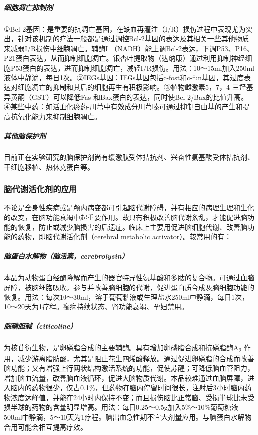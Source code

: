 \subparagraph{细胞凋亡抑制剂}

①Bcl-2基因：是重要的抗凋亡基因，在缺血再灌注（I/R）损伤过程中表现尤为突出，针对该机制的疗法一般都是通过调控Bcl-2基因的表达及其相关一些其他物质来减弱I/R损伤中细胞凋亡。辅酶I
（NADH）能上调Bcl-2表达，下调P53、P16、P21蛋白表达，从而抑制细胞凋亡。银杏叶提取物（达纳康）通过利用抑制神经细胞P53蛋白的表达，进而抑制细胞凋亡，减轻I/R损伤。用法：10～15ml加入250ml液体中静滴，每日1次。②IEGs基因：IEGs基因包括c-fost和c-fun基因，其过度表达对细胞凋亡的抑制和其后的细胞再生有积极影响。③植物雌激素5，7，4-三羟基异黄酮（GST）可以降低Fas
和Bax蛋白的表达，同时使Bcl-2/Bax的比值升高。④某些中药：如活血化瘀药-川芎中有效成分川芎嗪可通过抑制自由基的产生和提高抗氧化能力来抑制细胞凋亡。

\subparagraph{其他脑保护剂}

目前正在实验研究的脑保护剂尚有缓激肽受体拮抗剂、兴奋性氨基酸受体拮抗剂、干细胞移植、热休克蛋白等。

\subsubsection{脑代谢活化剂的应用}

不论是全身性疾病或是颅内病变都可引起脑代谢障碍，并有相应的病理生理和生化的改变，在脑功能衰竭中起重要作用。故只有积极改善脑代谢紊乱，才能促进脑功能的恢复，防止或减少脑损害的后遗症。临床上主要用促进脑细胞代谢、改善脑功能的药物，即脑代谢活化剂（cerebral
metabolic activator）。较常用的有：

\subparagraph{脑蛋白水解物（脑活素，cerebrolysin）}

本品为动物蛋白经酶降解而产生的器官特异性氨基酸和多肽的复合物。可通过血脑屏障，被脑细胞吸收。参与并改善脑细胞的代谢，促进蛋白质合成及脑细胞功能的恢复。用法：每次10～30ml，溶于葡萄糖液或生理盐水250ml中静滴，每日1次，10～20天为1疗程。癫痫持续状态、肾功能衰竭、孕妇禁用。

\subparagraph{胞磷胆碱（citicoline）}

为核苷衍生物，是卵磷脂合成的主要辅酶。具有增加卵磷脂合成和抗磷脂酶A\textsubscript{2}
作用，减少游离脂肪酸，尤其是阻止花生四烯酸释放。通过促进卵磷脂的合成而改善脑功能；又有增强上行网状结构激活系统的功能，促使苏醒；可降低脑血管阻力，增加脑血流量，改善脑血液循环，促进大脑物质代谢。本品较难通过血脑屏障，进入脑内的药物很少，仅占0.1\%，但药物在脑内停留时间很长，注射后3小时脑内药物浓度达峰值，并能在24小时内保持不变；而且损伤脑比正常脑、受损半球比未受损半球的药物的含量明显增高。用法：每日0.25～0.5g加入5\%～10\%葡萄糖液500ml中静滴，5～10天为1疗程。脑出血急性期不宜大剂量应用。与脑蛋白水解物合用可能会相互提高疗效。

